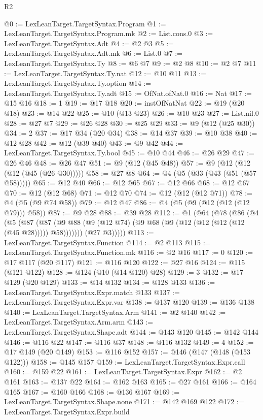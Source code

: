\begin{lexlean}{R2}
\begin{coremodule}
@0 := LexLeanTarget.TargetSyntax.Program
@1 := LexLeanTarget.TargetSyntax.Program.mk
@2 := List.cons.{0}
@3 := LexLeanTarget.TargetSyntax.Adt
@4 := @2 @3
@5 := LexLeanTarget.TargetSyntax.Adt.mk
@6 := List.{0}
@7 := LexLeanTarget.TargetSyntax.Ty
@8 := @6 @7
@9 := @2 @8
@10 := @2 @7
@11 := LexLeanTarget.TargetSyntax.Ty.nat
@12 := @10 @11
@13 := LexLeanTarget.TargetSyntax.Ty.option
@14 := LexLeanTarget.TargetSyntax.Ty.adt
@15 := OfNat.ofNat.{0}
@16 := Nat
@17 := @15 @16
@18 := 1
@19 := @17 @18
@20 := instOfNatNat
@22 := @19 (@20 @18)
@23 := @14 @22
@25 := @10 (@13 @23)
@26 := @10 @23
@27 := List.nil.{0}
@28 := @27 @7
@29 := @26 @28
@30 := @25 @29
@33 := @9 (@12 (@25 @30))
@34 := 2
@37 := @17 @34 (@20 @34)
@38 := @14 @37
@39 := @10 @38
@40 := @12 @28
@42 := @12 (@39 @40)
@43 := @9 @42
@44 := LexLeanTarget.TargetSyntax.Ty.bool
@45 := @10 @44
@46 := @26 @29
@47 := @26 @46
@48 := @26 @47
@51 := @9 (@12 (@45 @48))
@57 := @9 (@12 (@12 (@12 (@45 (@26 @30)))))
@58 := @27 @8
@64 := @4 (@5 (@33 (@43 (@51 (@57 @58)))))
@65 := @12 @40
@66 := @12 @65
@67 := @12 @66
@68 := @12 @67
@70 := @12 (@12 @68)
@71 := @12 @70
@74 := @12 (@12 (@12 @71))
@78 := @4 (@5 (@9 @74 @58))
@79 := @12 @47
@86 := @4 (@5 (@9 (@12 (@12 (@12 @79))) @58))
@87 := @9 @28
@88 := @39 @28
@112 := @1
    (@64
      (@78
        (@86
          (@4
            (@5
              (@87
                (@87 (@9 @88 (@9 (@12 @74) (@9 @68 (@9 (@12 (@12 (@12 (@12 (@45 @28))))) @58)))))))
            (@27 @3)))))
@113 := LexLeanTarget.TargetSyntax.Function
@114 := @2 @113
@115 := LexLeanTarget.TargetSyntax.Function.mk
@116 := @2 @16
@117 := 0
@120 := @17 @117 (@20 @117)
@121 := @116 @120
@122 := @27 @16
@124 := @115 (@121 @122)
@128 := @124 (@10 (@14 @120) @28)
@129 := 3
@132 := @17 @129 (@20 @129)
@133 := @14 @132
@134 := @128 @133
@136 := LexLeanTarget.TargetSyntax.Expr.match @133
@137 := LexLeanTarget.TargetSyntax.Expr.var
@138 := @137 @120
@139 := @136 @138
@140 := LexLeanTarget.TargetSyntax.Arm
@141 := @2 @140
@142 := LexLeanTarget.TargetSyntax.Arm.arm
@143 := LexLeanTarget.TargetSyntax.Shape.adt
@144 := @143 @120
@145 := @142 @144
@146 := @116 @22
@147 := @116 @37
@148 := @116 @132
@149 := 4
@152 := @17 @149 (@20 @149)
@153 := @116 @152
@157 := @146 (@147 (@148 (@153 @122)))
@158 := @145 @157
@159 := LexLeanTarget.TargetSyntax.Expr.call
@160 := @159 @22
@161 := LexLeanTarget.TargetSyntax.Expr
@162 := @2 @161
@163 := @137 @22
@164 := @162 @163
@165 := @27 @161
@166 := @164 @165
@167 := @160 @166
@168 := @136 @167
@169 := LexLeanTarget.TargetSyntax.Shape.none
@171 := @142 @169 @122
@172 := LexLeanTarget.TargetSyntax.Expr.build

\end{coremodule}
\end{lexlean}
